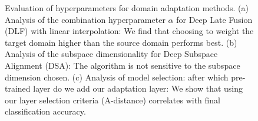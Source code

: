 \begin{figure}
\centering
{}
\caption{Evaluation of hyperparameters for domain adaptation methods. (a) Analysis of the combination hyperparameter $\alpha$ for Deep Late Fusion (DLF) with linear interpolation: We find that choosing to weight the target domain higher than the source domain performs best.  (b) Analysis of the subspace dimensionality for Deep Subspace Alignment (DSA): The algorithm is not sensitive to the subspace dimension chosen. (c) Analysis of model selection: after which pre-trained layer do we add our adaptation layer: We show that using our layer selection criteria (A-distance) correlates with final classification accuracy.}
\label{fig:hyperparam-eval}
\end{figure}
